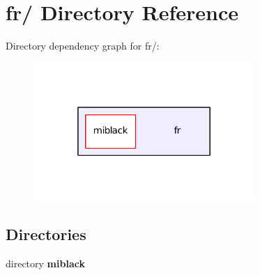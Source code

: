 \section{fr/ Directory Reference}
\label{dir_842f391c3395acb31461cd3ab3c2f8a4}
Directory dependency graph for fr/\-:
\nopagebreak
\begin{figure}[H]
\begin{center}
\leavevmode
\includegraphics[width=238pt]{dir_842f391c3395acb31461cd3ab3c2f8a4_dep}
\end{center}
\end{figure}
\subsection*{Directories}
\begin{DoxyCompactItemize}
\item 
directory {\bf miblack}
\end{DoxyCompactItemize}
